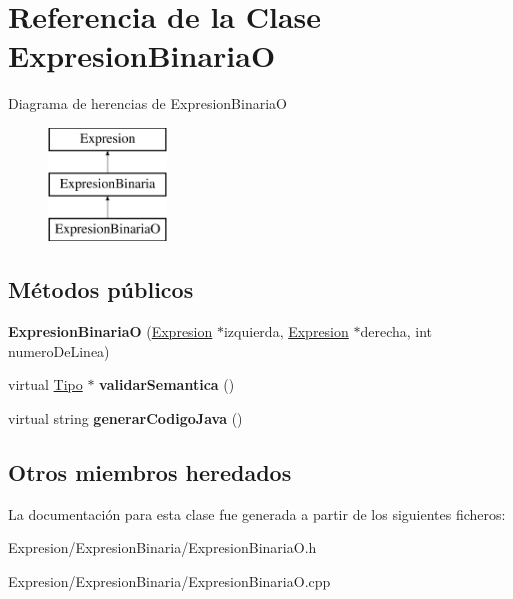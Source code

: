 \hypertarget{class_expresion_binaria_o}{\section{Referencia de la Clase Expresion\-Binaria\-O}
\label{class_expresion_binaria_o}
}
Diagrama de herencias de Expresion\-Binaria\-O\begin{figure}[H]
\begin{center}
\leavevmode
\includegraphics[height=3.000000cm]{class_expresion_binaria_o}
\end{center}
\end{figure}
\subsection*{Métodos públicos}
\begin{DoxyCompactItemize}
\item 
\hypertarget{class_expresion_binaria_o_a8b8be1b1e05c541961fc3d3acb1725d0}{{\bfseries Expresion\-Binaria\-O} (\hyperlink{class_expresion}{Expresion} $\ast$izquierda, \hyperlink{class_expresion}{Expresion} $\ast$derecha, int numero\-De\-Linea)}\label{class_expresion_binaria_o_a8b8be1b1e05c541961fc3d3acb1725d0}

\item 
\hypertarget{class_expresion_binaria_o_a604c2812bc9bec75fdf0396c6a261252}{virtual \hyperlink{class_tipo}{Tipo} $\ast$ {\bfseries validar\-Semantica} ()}\label{class_expresion_binaria_o_a604c2812bc9bec75fdf0396c6a261252}

\item 
\hypertarget{class_expresion_binaria_o_ae533c76a4744d62b90567c1fe61bed07}{virtual string {\bfseries generar\-Codigo\-Java} ()}\label{class_expresion_binaria_o_ae533c76a4744d62b90567c1fe61bed07}

\end{DoxyCompactItemize}
\subsection*{Otros miembros heredados}


La documentación para esta clase fue generada a partir de los siguientes ficheros\-:\begin{DoxyCompactItemize}
\item 
Expresion/\-Expresion\-Binaria/Expresion\-Binaria\-O.\-h\item 
Expresion/\-Expresion\-Binaria/Expresion\-Binaria\-O.\-cpp\end{DoxyCompactItemize}
